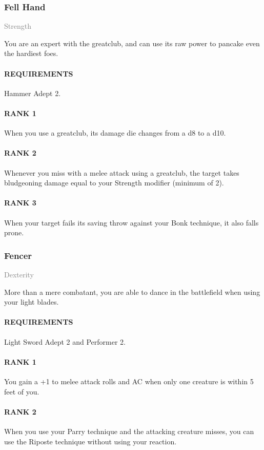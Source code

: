 \subsubsection{Fell Hand} \label{feat::fellhand}
\small{\textcolor{gray}{Strength}}

\normalsize
You are an expert with the greatclub, and can use its raw power to pancake even the hardiest foes.
\paragraph{REQUIREMENTS} Hammer Adept 2.
\paragraph{RANK 1} When you use a greatclub, its damage die changes from a d8 to a d10.
\paragraph{RANK 2} Whenever you miss with a melee attack using a greatclub, the target takes bludgeoning damage equal to your Strength modifier (minimum of 2).
\paragraph{RANK 3} When your target fails its saving throw against your Bonk technique, it also falls prone.

\subsubsection{Fencer} \label{feat::fencer}
\small{\textcolor{gray}{Dexterity}}

\normalsize
More than a mere combatant, you are able to dance in the battlefield when using your light blades.
\paragraph{REQUIREMENTS} Light Sword Adept 2 and Performer 2.
\paragraph{RANK 1} You gain a +1 to melee attack rolls and AC when only one creature is within 5 feet of you.
\paragraph{RANK 2} When you use your Parry technique and the attacking creature misses, you can use the Riposte technique without using your reaction.
